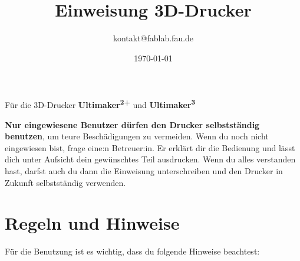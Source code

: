 \documentclass{\basedir/fablab-document}
\date{\today}
\author{kontakt@fablab.fau.de}
\title{Einweisung 3D-Drucker}
\newcommand{\ts}[1]{\textsuperscript{#1}}
\begin{document}
\maketitle
\begin{center}
	Für die 3D-Drucker \textbf{Ultimaker\ts{2+}} und \textbf{Ultimaker\ts{3}}
\end{center}

\textbf{Nur eingewiesene Benutzer dürfen den Drucker selbstständig benutzen}, um teure Beschädigungen zu vermeiden. Wenn du noch nicht eingewiesen bist, frage eine:n Betreuer:in. Er erklärt dir die Bedienung und lässt dich unter Aufsicht dein gewünschtes Teil ausdrucken. Wenn du alles verstanden hast, darfst auch du dann die Einweisung unterschreiben und den Drucker in Zukunft selbstständig verwenden.

\section{Regeln und Hinweise}
Für die Benutzung ist es wichtig, dass du folgende Hinweise beachtest:
\end{document}
